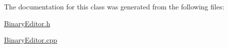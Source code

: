 The documentation for this class was generated from the following files\-:\begin{DoxyCompactItemize}
\item 
\hyperlink{_binary_editor_8h}{Binary\-Editor.\-h}\item 
\hyperlink{_binary_editor_8cpp}{Binary\-Editor.\-cpp}\end{DoxyCompactItemize}

